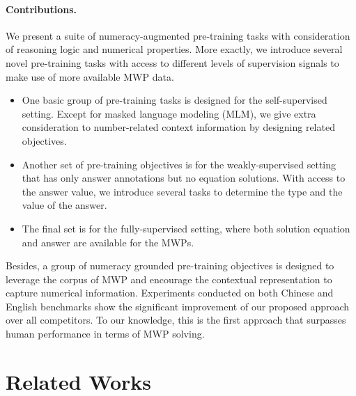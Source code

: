 \documentclass[11pt]{article}
\begin{document}
\paragraph{Contributions.}
We present a suite of numeracy-augmented pre-training tasks with consideration of reasoning logic and numerical properties. More exactly, we introduce several novel pre-training tasks with access to different levels of supervision signals to make use of more available MWP data. 
\begin{itemize}
    \item One basic group of pre-training tasks is designed for the self-supervised setting. Except for masked language modeling (MLM), we give extra consideration to number-related context information by designing related objectives. 
    \item Another set of pre-training objectives is for the weakly-supervised setting that has only  answer annotations  but no equation solutions. With access to the answer value, we introduce several tasks to determine the type and the value of the answer. 
    \item The final set is for the fully-supervised setting, where both solution equation and answer are available for the MWPs. 
\end{itemize}
Besides, a group of numeracy grounded pre-training objectives is designed to leverage the corpus of MWP and encourage the contextual representation to capture numerical information. Experiments conducted on both Chinese and English benchmarks show the significant improvement of our proposed approach over all competitors. To our knowledge, this is the first approach that surpasses human performance \cite{wang2019template} in terms of MWP solving.
 
\section{Related Works}
\end{document}
